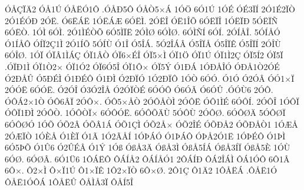 {^^d3^^c5^^c7^^cf^^c42
^^d3^^c51^^da
^^d3^^c5^^cb^^d31^^d4
.^^d3^^c5^^d05^^d4
^^d3^^c5^^d25^^d7^^c1
1^^d3^^d6
6^^d31^^da
1^^d3^^c9
^^d3^^c93^^cf^^cd
2^^d31^^c92^^cf^^d2
2^^d31^^c9^^d3^^d0
2^^d3^^cb.
^^d36^^cb^^c1^^cb
1^^d3^^cb^^c1^^c6
6^^d3^^cb^^cc.
2^^d3^^cb^^ce
^^d3^^cb1^^ce^^d5
6^^d3^^cb^^cf^^ce
1^^d3^^cb^^cf^^d0
5^^d3^^cb^^cf^^d1
6^^d3^^cb^^d2.
1^^d3^^cc
6^^d3^^cc.
2^^d31^^cc^^c9^^d2^^d5
6^^d35^^cc^^cf^^cb
2^^d3^^cc^^d8
6^^d3^^cc^^d8.
6^^d3^^cc^^d1^^cd
6^^d3^^cd.
2^^d3^^cd^^c5^^ce.
5^^d3^^cd^^c5^^d3
^^d31^^cd^^c5^^d4
^^d3^^cd^^cf2^^c71^^cc
2^^d31^^cd^^d5
5^^d3^^cd^^d9
^^d31^^ce
^^d35^^ce^^c1.
5^^d32^^ce^^c1^^c2
^^d35^^ce^^cf^^c5
^^d35^^ce^^cf^^ca
^^d35^^ce^^cf^^cd
2^^d3^^ce^^d9
6^^d3^^ce^^d8.
1^^d3^^cf
^^d3^^cf^^c21^^cc^^c1^^c7
^^d3^^cf1^^c2^^d2
^^d3^^cf6^^d7^^c9^^ce
^^d3^^cf5^^d7^^cc
^^d3^^cf1^^d6
^^d3^^cf1^^da
^^d3^^cf1^^cc2^^c7
^^d3^^cf5^^cd2
^^d3^^cf5^^cf
.^^d3^^cf^^d01^^cc
^^d3^^cf1^^d22^^d7
^^d3^^cf1^^d32
^^d3^^cf6^^d35^^ce
^^d3^^cf1^^d4^^d7
^^d3^^cf5^^dd
^^d31^^d0^^c1
1^^d3^^d0^^c5^^ce^^d3
^^d3^^d0^^c51^^d22^^d3^^c9
^^d32^^d0^^c5^^db
^^d35^^d0^^c9^^cc
^^d31^^d0^^c9^^d4
^^d31^^d0^^cc
^^d32^^d0^^cf^^d3
1^^d32^^d0^^cf^^d4
1^^d3^^d2
6^^d3^^d3.
^^d31^^d3
^^d32^^d3^^c2
^^d3^^d31^^d7^^cf
2^^d3^^d3^^cb
6^^d3^^d3^^cb.
^^d32^^d3^^ce
^^d33^^d32^^ce^^c5
^^d32^^d3^^cf^^d2^^c9
6^^d3^^d3^^d4
^^d36^^d3^^c3
^^d36^^d3^^db
.^^d3^^d3^^d96
2^^d3^^d4.
^^d3^^d4^^c12^^d71^^d2
^^d3^^d46^^c2^^cf
2^^d3^^d4^^d7.
^^d3^^d45^^d7^^c5^^d2
2^^d3^^d4^^c5^^d2^^cc
2^^d3^^d4^^cb
^^d3^^d41^^cc^^c9
6^^d3^^d4^^cd.
2^^d3^^d4^^ce
1^^d3^^d4^^cf
^^d3^^d4^^cf1^^d0^^cc
2^^d3^^d4^^d2.
1^^d3^^d4^^d2^^cf^^d7
6^^d3^^d4^^d3^^cb.
6^^d3^^d4^^d5^^c4^^d9
5^^d3^^d4^^d9
2^^d3^^d4^^d8.
6^^d3^^d4^^d8^^c4
5^^d3^^d4^^d8^^cf
6^^d3^^d4^^d8^^d3
1^^d3^^d5
^^d3^^d52^^c2
^^d3^^d5^^c21^^c1
^^d3^^d51^^c7^^cc
^^d3^^d52^^c5^^d7
^^d3^^d52^^ce^^c9
^^d3^^d5^^d0^^c52
^^d3^^d5^^d0^^c5^^d21
1^^d3^^c6^^c5
2^^d3^^c6^^cf^^d2
1^^d3^^c8^^c5
^^d31^^c8^^cf
^^d31^^c3
1^^d32^^c3^^c5^^cd
1^^d3^^de^^c1^^d3
^^d31^^de^^c1^^d4
^^d3^^de^^c52^^d31^^cb
1^^d3^^de^^c9^^d4
^^d31^^de^^cc
6^^d35^^de^^d5
^^d31^^db6
^^d32^^db^^c9^^c2
^^d31^^dd
1^^d3^^df
^^d3^^df^^c53^^c4
^^d3^^df^^c53^^cc
^^d3^^df^^c55^^cd^^c1
^^d3^^df^^c53^^cd^^cf
^^d3^^df^^c55^^c8
1^^d3^^d9
6^^d3^^d8.
6^^d3^^d8^^c2.
6^^d31^^dc6
1^^d4^^c1^^cb^^d4
^^d4^^c1^^cd^^c52
^^d4^^c1^^cd^^c5^^d31
2^^d4^^c1^^cd^^d0
^^d4^^c12^^ce^^c1^^cc
^^d4^^c11^^d3^^d4
6^^d41^^c2
6^^d4^^d7.
^^d42^^d7^^cc
^^d4^^d7^^cf1^^da
^^d41^^d7^^cf^^ca
1^^d42^^d7^^cf^^d2
6^^d4^^d7^^d8.
2^^d41^^c7
^^d41^^c42
1^^d4^^c5^^cb^^c1
.^^d4^^c5^^cb1^^d3
^^d4^^c5^^cb1^^d3^^d4^^c1
1^^d4^^c5^^cb^^db
^^d4^^c5^^cc^^c53^^cf
^^d4^^c5^^cd5^^ce
}
